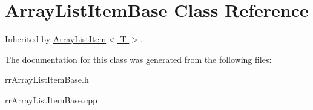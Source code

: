 \hypertarget{classrrc_1_1_array_list_item_base}{\section{Array\-List\-Item\-Base Class Reference}
\label{classrrc_1_1_array_list_item_base}
}


Inherited by \hyperlink{classrrc_1_1_array_list_item}{Array\-List\-Item$<$ T $>$}.



The documentation for this class was generated from the following files\-:\begin{DoxyCompactItemize}
\item 
rr\-Array\-List\-Item\-Base.\-h\item 
rr\-Array\-List\-Item\-Base.\-cpp\end{DoxyCompactItemize}
